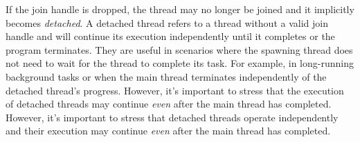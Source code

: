 If the join handle is dropped, the thread may no longer be joined and it implicitly becomes \emph{detached}.
A detached thread refers to a thread without a valid join handle
and will continue its execution independently until it completes or the program terminates.
They are useful in scenarios where the spawning thread
does not need to wait for the thread to complete its task.
For example, in long-running background tasks or
when the main thread terminates independently of the detached thread's progress.
However, it's important to stress that
the execution of detached threads may continue \emph{even} after the main thread has completed.
However, it's important to stress that detached threads operate independently
and their execution may continue \emph{even} after the main thread has completed.

